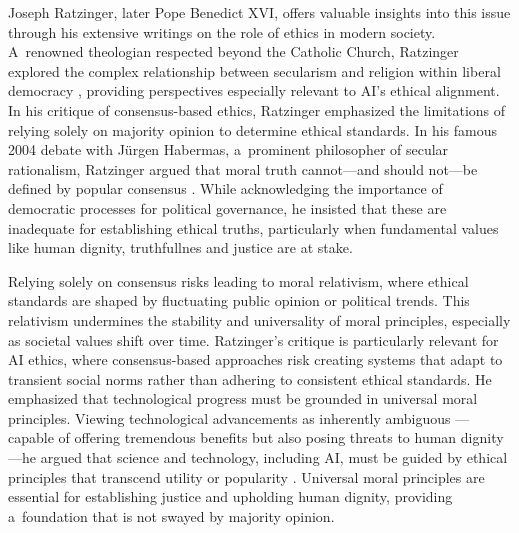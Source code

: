 \documentclass[%
  manuscript=article,
  year=2024,
  volume=77,
  doi=00000.000,
]{zfn}
\begin{document}
Joseph Ratzinger, later Pope Benedict XVI, offers valuable insights into this issue through his extensive writings on the role of ethics in modern society. A~renowned theologian respected beyond the Catholic Church, Ratzinger explored the complex relationship between secularism and religion within liberal democracy 
\parencite[][]{paskewich_liberalism_2008}, %
 providing perspectives especially relevant to AI's ethical alignment. In his critique of consensus-based ethics, Ratzinger emphasized the limitations of relying solely on majority opinion to determine ethical standards. In his famous 2004 debate with Jürgen Habermas, a~prominent philosopher of secular rationalism, Ratzinger argued that moral truth cannot---and should not---be defined by popular consensus 
\parencite[][]{ratzinger_dialectics_2006}. %
 While acknowledging the importance of democratic processes for political governance, he insisted that these are inadequate for establishing ethical truths, particularly when fundamental values like human dignity, truthfullnes and justice are at stake.



Relying solely on consensus risks leading to moral relativism, where ethical standards are shaped by fluctuating public opinion or political trends. This relativism undermines the stability and universality of moral principles, especially as societal values shift over time. Ratzinger's critique is particularly relevant for AI ethics, where consensus-based approaches risk creating systems that adapt to transient social norms rather than adhering to consistent ethical standards. He emphasized that technological progress must be grounded in universal moral principles. Viewing technological advancements as inherently ambiguous 
\parencite[][]{latkovic_thinking_2015}%
---capable of offering tremendous benefits but also posing threats to human dignity---he argued that science and technology, including AI, must be guided by ethical principles that transcend utility or popularity 
\parencite[][section 70]{benedict_xvi_caritas_2009}. %
 Universal moral principles are essential for establishing justice and upholding human dignity, providing a~foundation that is not swayed by majority opinion.
\end{document}
